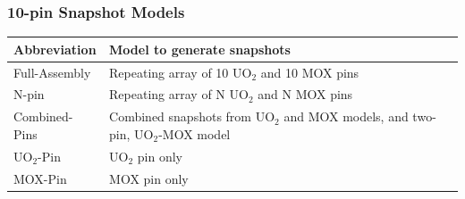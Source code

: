 \documentclass[fleqn]{beamer}
\begin{document}
  \begin{frame}
    \frametitle{10-pin Snapshot Models}
    \begin{table}
      \begin{tabular}{l | p{7cm}}\toprule
	Abbreviation    & Model to generate snapshots \\ \midrule
        Full-Assembly   & Repeating array of 10 UO$_2$ and 10 MOX pins \\
        N-pin           & Repeating array of N UO$_2$ and N MOX pins \\ 
        Combined-Pins   & Combined snapshots from UO$_2$ and MOX models, and 
        two-pin, UO$_2$-MOX model \\
        UO$_2$-Pin      & UO$_2$ pin only \\
        MOX-Pin         & MOX pin only \\
        \bottomrule
      \end{tabular}
      \label{tab:snapshots}
    \end{table}
  \end{frame}
  
\end{document}
